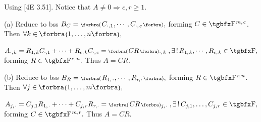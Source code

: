 Using [4E 3.51]. Notice that $A\neq 0\Rightarrow c,r\geqslant 1.$\vspace{2pt}\par\quad
(a) Reduce to bss $B_C=\BigPar{C_{\cdot,1},\cdots,C_{\cdot,\;\!c}},$ forming $C\in\FbbP{m,\;\!c}$. Then $\forall k\in\;\!\!\Bra{1,\dots,n},$\vspace{2pt}\par\quad\Ha
$A_{\cdot,\;\!k}=R_{1,\;\!k}C_{\cdot,1}+\dots+R_{c,\;\!k}C_{\cdot,\;\!c}=\BigPar{CR}{_{\cdot,\;\!k}}\;,\exists\,!\,R_{1,\;\!k},\cdots,R_{c,\;\!k}\in\Fbb,$ forming $R\in\FbbP{c,\;\!n}.$ Thus $A=CR.$\vspace{4pt}\par\quad
(b) Reduce to bss $B_R=\BigPar{R_{1,\;\!\cdot},\cdots,R_{r\:\!\!,\:\!\cdot}},$ forming $R\in\FbbP{r\:\!\!,\;\!n}$. Then $\forall j\in\;\!\!\Bra{1,\dots,m},$\vspace{2pt}\par\quad\Hb
$A_{j,\;\!\cdot}=C_{j,1}R_{1,\;\!\cdot}+\dots+C_{j,\;\!r}R_{r\:\!\!,\:\!\cdot}=\BigPar{CR}{_{j,\;\!\cdot}}\;,\exists\,!\,C_{j,1},\dots,C_{j,\;\!r}\in\Fbb,$ forming $C\in\FbbP{m,r}.$ Thus $A=CR.$\PfEnd
\SepLine

